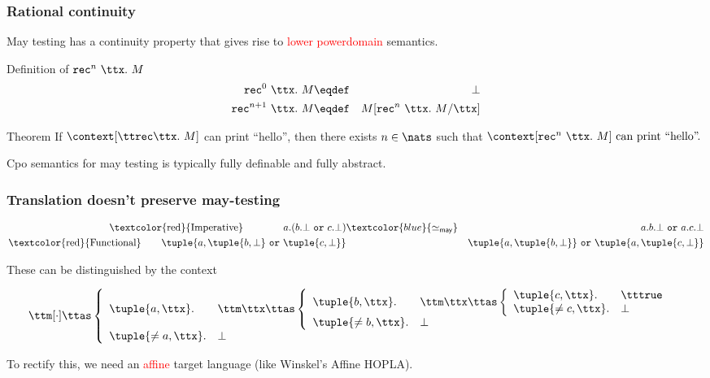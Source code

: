 \documentclass{beamer}
\newcommand{\ttor}{\ \mathtt{or}\ }
\newcommand{\may}{\mathsf{may}}
\newcommand{\recapp}[3]{\mathtt{rec}^{{#1}}\ {#2}}
\newcommand{\red}[1]{\textcolor{red}{#1}}
\newcommand{\blue}[1]{\textcolor{blue}{#1}}
\begin{document}
\begin{frame}\frametitle{Rational continuity}
  
May testing has a continuity property that gives rise to \red{lower powerdomain} semantics.

\begin{block}{Definition of $\recapp{n}{\ttx.\
 M}{N}$}
\begin{eqnarray*}
  \recapp{0}{\ttx.\ M}{N} & \eqdef & \bot \\
  \recapp{n+1}{\ttx.\ M}{N} & \eqdef & M[\recapp{n}{\ttx.\ M}{N}/\ttx]
\end{eqnarray*}
\end{block}

\begin{block}{Theorem}
  If $\context[\ttrec \ttx.\ M]$ can print ``hello'', then there exists $n \in \nats$ such that
\begin{math}
  \context[\recapp{n}{\ttx.\ M}{N}] \mbox{ can print ``hello''.}
\end{math}
\end{block}

Cpo semantics for may testing is typically fully definable and fully abstract.

\end{frame}

\begin{frame}\frametitle{Translation doesn't preserve may-testing}
  



\begin{eqnarray*}
\mbox{\red{Imperative}} \hspace{4em}  a. (b.\bot \ttor c.\bot) & \blue{\simeq_{\may}} &  a.b.\bot \ttor a.c. \bot \\
\mbox{\red{Functional}} \hspace{2em}  \tuple{a,\tuple{b,\bot} \ttor \tuple{c, \bot}} & &   \tuple{a,\tuple{b,\bot}} \ttor \tuple{a, \tuple{c,\bot}}
\end{eqnarray*}

These can be distinguished by the context

{\small \begin{displaymath}
  \ttm [\cdot] \ttas \left\{
    \begin{array}{ll}
\tuple{a,\ttx}. & 
 \ttm \ttx \ttas \left\{
   \begin{array}{ll}
  \tuple{b,\ttx}. & 
 \ttm \ttx \ttas \left \{
   \begin{array}{ll}
\tuple{c,\ttx}. & \tttrue \\
\tuple{\not= c, \ttx}. & \bot
   \end{array} \right. \\
  \tuple{\not= b,\ttx}. & \bot
   \end{array} \right. \\
\tuple{\not= a, \ttx}. & \bot
    \end{array} \right.
\end{displaymath} }

To rectify this, we need an \red{affine} target language (like Winskel's Affine HOPLA).

\end{frame}
\end{document}
